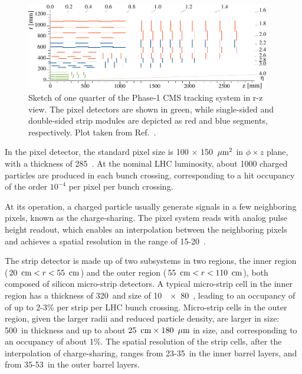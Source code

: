 \begin{figure}[!htb]
    \centering
    \includegraphics[width=0.95\textwidth]{pics/LHC_CMS/Phase1_Tracker.pdf}
    \caption{Sketch of one quarter of the Phase-1 CMS tracking system in r-z view.
             The pixel detectors are shown in green, 
             while single-sided and double-sided strip modules are depicted as red and blue segments, respectively.
             Plot taken from Ref.~\cite{phase1_tracker}.}
    \label{fig:cms_tracker}
\end{figure}

In the pixel detector, the standard pixel size is 100 $\times$ 150 $\,\mu\text{m}^{2}$ in $\phi \times z$ plane, with a thickness of 285~\mum.
At the nominal LHC luminosity, about 1000 charged particles are produced in each bunch crossing, 
corresponding to a hit occupancy of the order $10^{-4}$ per pixel per bunch crossing.

At its operation, a charged particle usually generate signals in a few neighboring pixels, known as the charge-sharing.
The pixel system reads with analog pulse height readout, which enables an interpolation between the neighboring pixels
and achieves a spatial resolution in the range of 15-20~\mum.

The strip detector is made up of two subsystems in two regions, the inner region ($20~\,\text{cm} < r < 55~\,\text{cm}$) 
and the outer region ($55~\,\text{cm} < r < 110~\,\text{cm}$), both composed of silicon micro-strip detectors. 
A typical micro-strip cell in the inner region has a thickness of 320~\mum and size of 10~\cm~$\times$~80~\mum,
leading to an occupancy of of up to 2-3\% per strip per LHC bunch crossing.
Micro-strip cells in the outer region, given the larger radii and reduced particle density, are larger in size:
500~\mum in thickness and up to about $25~\,\text{cm} \times 180~\,\mu\text{m}$ in size,
and corresponding to an occupancy of about 1\%.
The spatial resolution of the strip cells, after the interpolation of charge-sharing, 
ranges from 23-35~\mum in the inner barrel layers, and from 35-53~\mum in the outer barrel layers.  

